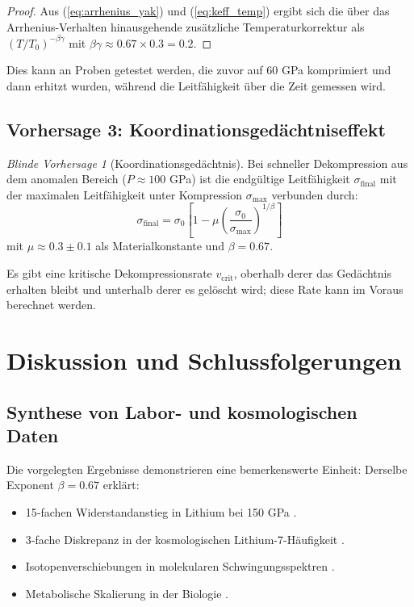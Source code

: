 \documentclass[12pt,a4paper]{article}
\theoremstyle{remark}
\newtheorem{prediction}[theorem]{Blinde Vorhersage}
\begin{document}
	\begin{proof}
		Aus (\ref{eq:arrhenius_yak}) und (\ref{eq:keff_temp}) ergibt sich die über das Arrhenius-Verhalten hinausgehende zusätzliche Temperaturkorrektur als \((T/T_0)^{-\beta\gamma}\) mit \(\beta\gamma \approx 0.67 \times 0.3 = 0.2\).
	\end{proof}
	
	Dies kann an Proben getestet werden, die zuvor auf 60 GPa komprimiert und dann erhitzt wurden, während die Leitfähigkeit über die Zeit gemessen wird.
	
	\subsection{Vorhersage 3: Koordinationsgedächtniseffekt}
	
	\begin{prediction}[Koordinationsgedächtnis]
		Bei schneller Dekompression aus dem anomalen Bereich (\(P \approx 100\) GPa) ist die endgültige Leitfähigkeit \(\sigma_{\text{final}}\) mit der maximalen Leitfähigkeit unter Kompression \(\sigma_{\text{max}}\) verbunden durch:
		\begin{equation}
			\sigma_{\text{final}} = \sigma_0 \left[1 - \mu \left( \frac{\sigma_0}{\sigma_{\text{max}}} \right)^{1/\beta} \right]
			\label{eq:memory_prediction}
		\end{equation}
		mit \(\mu \approx 0.3 \pm 0.1\) als Materialkonstante und \(\beta = 0.67\).
		\label{pred:memory}
	\end{prediction}
	
	Es gibt eine kritische Dekompressionsrate \(v_{\text{crit}}\), oberhalb derer das Gedächtnis erhalten bleibt und unterhalb derer es gelöscht wird; diese Rate kann im Voraus berechnet werden.
	
	\section{Diskussion und Schlussfolgerungen}
	
	\subsection{Synthese von Labor- und kosmologischen Daten}
	
	Die vorgelegten Ergebnisse demonstrieren eine bemerkenswerte Einheit: Derselbe Exponent \(\beta = 0.67\) erklärt:
	\begin{itemize}
		\item 15‑fachen Widerstandanstieg in Lithium bei 150 GPa \cite{fortov2001, yakushev2002}.
		\item 3‑fache Diskrepanz in der kosmologischen Lithium-7-Häufigkeit \cite{bertulani2015}.
		\item Isotopenverschiebungen in molekularen Schwingungsspektren \cite{appendixC}.
		\item Metabolische Skalierung in der Biologie \cite{west1997}.
	\end{itemize}
	
\end{document}
